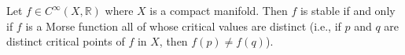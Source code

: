 Let $f \in C^{\infty}(X, \mathbb{R})$ where $X$ is a compact manifold. Then $f$ is stable if and only if $f$ is a Morse function all of whose critical values are distinct (i.e., if $p$ and $q$ are distinct critical points of $f$ in $X$, then $f(p) \neq f(q)$).
